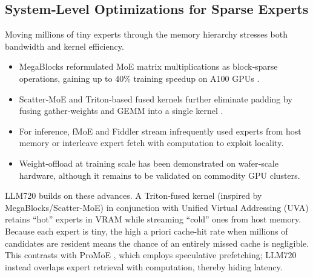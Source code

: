 \documentclass[12pt]{article}
\begin{document}
\subsection{System‑Level Optimizations for Sparse Experts}
Moving millions of tiny experts through the memory hierarchy stresses both bandwidth and kernel efficiency.
\begin{itemize}
  \item MegaBlocks reformulated MoE matrix multiplications as block‑sparse operations, gaining up to 40\% training speedup on A100 GPUs \cite{MegaBlocks2022}.
  \item Scatter‑MoE and Triton‑based fused kernels further eliminate padding by fusing gather‑weights and GEMM into a single kernel \cite{ExpertChoiceRouting2022}.
  \item For inference, fMoE \cite{fMOE2025} and Fiddler \cite{Fiddler2024} stream infrequently used experts from host memory or interleave expert fetch with computation to exploit locality.
  \item Weight‑offload at training scale has been demonstrated on wafer‑scale hardware, although it remains to be validated on commodity GPU clusters.
\end{itemize}
LLM720 builds on these advances. A Triton‑fused kernel (inspired by MegaBlocks/Scatter‑MoE) in conjunction with Unified Virtual Addressing (UVA) retains “hot” experts in VRAM while streaming “cold” ones from host memory. Because each expert is tiny, the high a priori cache‑hit rate when millions of candidates are resident means the chance of an entirely missed cache is negligible. This contrasts with ProMoE \cite{ProMoE2024}, which employs speculative prefetching; LLM720 instead overlaps expert retrieval with computation, thereby hiding latency.
\end{document}
